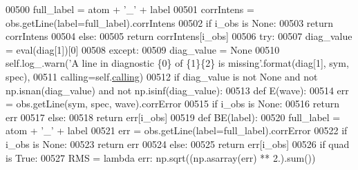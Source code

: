 \begin{DoxyCode}
00500                     full\_label = atom + \textcolor{stringliteral}{'\_'} + label
00501                     corrIntens = obs.getLine(label=full\_label).corrIntens
00502                     \textcolor{keywordflow}{if} i\_obs \textcolor{keywordflow}{is} \textcolor{keywordtype}{None}:
00503                         \textcolor{keywordflow}{return} corrIntens
00504                     \textcolor{keywordflow}{else}:
00505                         \textcolor{keywordflow}{return} corrIntens[i\_obs]
00506                 \textcolor{keywordflow}{try}:
00507                     diag\_value = eval(diag[1])[0]
00508                 \textcolor{keywordflow}{except}:
00509                     diag\_value = \textcolor{keywordtype}{None}
00510                     self.log\_.warn(\textcolor{stringliteral}{'A line in diagnostic \{0\} of \{1\}\{2\} is missing'}.format(diag[1], sym, 
      spec),
00511                                    calling=self.\hyperlink{classpyneb_1_1core_1_1diags_1_1_diagnostics_a07dce673fec8b2383ef411ab94b0b2fe}{calling})
00512                 \textcolor{keywordflow}{if} diag\_value \textcolor{keywordflow}{is} \textcolor{keywordflow}{not} \textcolor{keywordtype}{None} \textcolor{keywordflow}{and} \textcolor{keywordflow}{not} np.isnan(diag\_value) \textcolor{keywordflow}{and} \textcolor{keywordflow}{not} np.isinf(diag\_value):
00513                     \textcolor{keyword}{def }E(wave):
00514                         err = obs.getLine(sym, spec, wave).corrError
00515                         \textcolor{keywordflow}{if} i\_obs \textcolor{keywordflow}{is} \textcolor{keywordtype}{None}:
00516                             \textcolor{keywordflow}{return} err
00517                         \textcolor{keywordflow}{else}:
00518                             \textcolor{keywordflow}{return} err[i\_obs]
00519                     \textcolor{keyword}{def }BE(label):
00520                         full\_label = atom + \textcolor{stringliteral}{'\_'} + label
00521                         err = obs.getLine(label=full\_label).corrError
00522                         \textcolor{keywordflow}{if} i\_obs \textcolor{keywordflow}{is} \textcolor{keywordtype}{None}:
00523                             \textcolor{keywordflow}{return} err
00524                         \textcolor{keywordflow}{else}:
00525                             \textcolor{keywordflow}{return} err[i\_obs]
00526                     \textcolor{keywordflow}{if} quad \textcolor{keywordflow}{is} \textcolor{keyword}{True}:
00527                         RMS = \textcolor{keyword}{lambda} err: np.sqrt((np.asarray(err) ** 2.).sum())

\end{DoxyCode}

